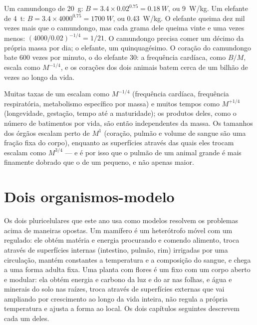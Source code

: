 \begin{example}\label{ex:b1:organism-environment:mouseelephant}
Um camundongo de \qty{20}{g}: $B = 3.4\times 0.02^{0.75} = \qty{0.18}{W}$,
ou \qty{9}{W/kg}. Um elefante de \qty{4}{t}: $B = 3.4\times 4000^{0.75} =
\qty{1700}{W}$, ou \qty{0.43}{W/kg}. O elefante queima dez mil vezes
mais que o camundongo, mas cada grama dele queima vinte e uma vezes
menos: $(4000/0.02)^{-1/4} = 1/21$. O camundongo precisa comer um
décimo da própria massa por dia; o elefante, um quinquagésimo. O
coração do camundongo bate \qty{600}{} vezes por minuto, o do elefante
\qty{30}{}: a frequência cardíaca, como $B/M$, escala como $M^{-1/4}$,
e os corações dos dois animais batem cerca de um bilhão de vezes ao
longo da vida.
\end{example}

\begin{remark}\label{rem:b1:organism-environment:consequences}
Muitas taxas de um  escalam como $M^{-1/4}$ (frequência
cardíaca, frequência respiratória, metabolismo específico por massa) e
muitos tempos como $M^{+1/4}$ (longevidade, gestação, tempo até a
maturidade); os produtos deles, como o número de batimentos por vida,
são então independentes da massa. Os tamanhos dos órgãos escalam perto
de $M^{1}$ (coração, pulmão e volume de sangue são uma fração fixa do
corpo), enquanto as superfícies através das quais eles trocam escalam
como $M^{3/4}$ --- e é por isso que o pulmão de um animal grande é mais
finamente dobrado que o de um pequeno, e não apenas maior.
\end{remark}

\section{Dois organismos-modelo}

\begin{proposition}\label{prop:b1:organism-environment:models}
Os dois  pluricelulares que este ano usa como modelos resolvem
os problemas acima de maneiras opostas. Um mamífero é um heterótrofo
móvel com um  regulado: ele obtém matéria e energia
procurando e comendo alimento, troca através de superfícies internas
(intestino, pulmão, rim) irrigadas por uma circulação, mantém
constantes a temperatura e a composição do sangue, e chega a uma forma
adulta fixa. Uma planta com flores é um  fixo com um corpo
aberto e modular: ela obtém energia e carbono da luz e do ar nas folhas,
e água e minerais do solo nas raízes, troca através de superfícies
externas que vai ampliando por crescimento ao longo da vida inteira, não
regula a própria temperatura e ajusta a forma ao local. Os dois
capítulos seguintes descrevem cada um deles.
\end{proposition}

